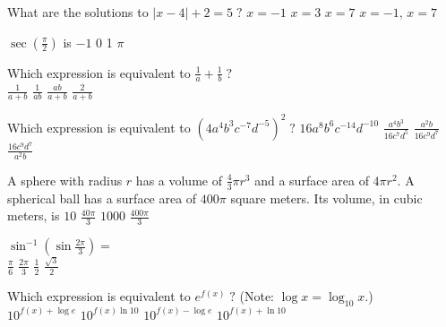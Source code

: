 \begin{question}
What are the solutions to \(|x - 4| + 2 = 5 \; ?\)
\choices
{\(x = -1\)}
{\(x = 3\)}
{\(x = 7\)}
{\(x = -1, \, x = 7\)}
{}
\end{question}

\begin{question}
\(\sec \left(\frac{\pi}{2} \right)\) is 
\choicesline
{\(-1\)}
{0}
{1}
{\(\pi\)}
{}
\end{question}

\begin{question}
Which expression is equivalent to \(\frac{1}{a} + \frac{1}{b} \; ?\) \\
\choicesline
{}
{\(\frac{1}{a + b}\)}
{\(\frac{1}{ab}\)}
{\(\frac{ab}{a + b}\)}
{\(\frac{2}{a + b}\)}
\end{question}

\begin{question}
Which expression is equivalent to \(\left(4a^4 b^3 c^{-7} d^{-5}\right)^2 \; ?\)
\choices
{\(16 a^8 b^6 c^{-14} d^{-10}\)}
{\(\frac{a^4 b^3}{16 c^7 d^5}\)}
{}
{\(\frac{a^2 b}{16 c^9 d^7}\)}
{\(\frac{16 c^9 d^7}{a^2 b}\)}
\end{question}

\begin{question}
A sphere with radius \(r\) has a volume of \(\frac{4}{3} \pi r^3\) and a surface area of \(4 \pi r^2.\)
A spherical ball has a surface area of \(400 \pi\) square meters. Its volume, in cubic meters, is 
\choicesline
{\(10\)}
{\(\frac{40 \pi}{3}\)}
{\(1000\)}
{\(\frac{400 \pi}{3}\)}
{}
\end{question}

\begin{question}
\(\sin^{-1} \left(\sin \frac{2 \pi}{3}\right) =\) \\
\choicesline
{\(\frac{\pi}{6}\)}
{}
{\(\frac{2 \pi}{3}\)}
{\(\frac{1}{2}\)}
{\(\frac{\sqrt 3}{2}\)}
\end{question}

\begin{question}
Which expression is equivalent to \(e^{f(x)} \; ?\) (Note: \(\log x = \log_{10} x.\)) \\
\choices
{}
{\(10^{f(x) + \log e}\)}
{\(10^{f(x) \ln 10}\)}
{\(10^{f(x) - \log e}\)}
{\(10^{f(x) + \ln 10}\)}
\end{question}

